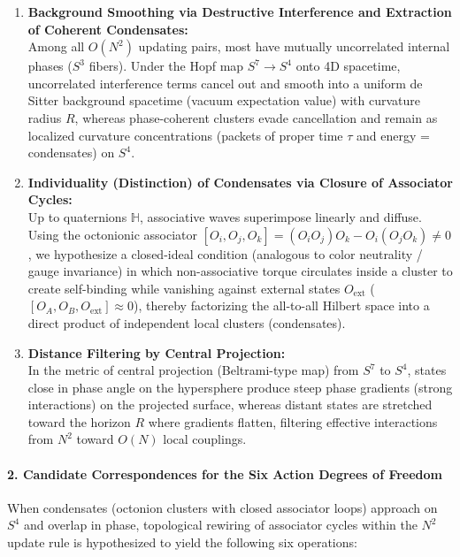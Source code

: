 \documentclass[
  a4paper,
]{article}
\providecommand{\tightlist}{%
  \setlength{\itemsep}{0pt}\setlength{\parskip}{0pt}}
\begin{document}
\begin{enumerate}
\def\labelenumi{\arabic{enumi}.}
\tightlist
\item
  \textbf{Background Smoothing via Destructive Interference and
  Extraction of Coherent Condensates:}\\
  Among all \(O(N^2)\) updating pairs, most have mutually uncorrelated
  internal phases (\(S^3\) fibers). Under the Hopf map \(S^7 \to S^4\)
  onto 4D spacetime, uncorrelated interference terms cancel out and
  smooth into a uniform de Sitter background spacetime (vacuum
  expectation value) with curvature radius \(R\), whereas phase-coherent
  clusters evade cancellation and remain as localized curvature
  concentrations (packets of proper time \(\tau\) and energy =
  condensates) on \(S^4\).
\item
  \textbf{Individuality (Distinction) of Condensates via Closure of
  Associator Cycles:}\\
  Up to quaternions \(\mathbb{H}\), associative waves superimpose
  linearly and diffuse. Using the octonionic associator
  \([O_i, O_j, O_k] = (O_i O_j)O_k - O_i(O_j O_k) \neq 0\), we
  hypothesize a closed-ideal condition (analogous to color neutrality /
  gauge invariance) in which non-associative torque circulates inside a
  cluster to create self-binding while vanishing against external states
  \(O_{\mathrm{ext}}\) (\([O_A, O_B, O_{\mathrm{ext}}] \approx 0\)),
  thereby factorizing the all-to-all Hilbert space into a direct product
  of independent local clusters (condensates).
\item
  \textbf{Distance Filtering by Central Projection:}\\
  In the metric of central projection (Beltrami-type map) from \(S^7\)
  to \(S^4\), states close in phase angle on the hypersphere produce
  steep phase gradients (strong interactions) on the projected surface,
  whereas distant states are stretched toward the horizon \(R\) where
  gradients flatten, filtering effective interactions from \(N^2\)
  toward \(O(N)\) local couplings.
\end{enumerate}

\paragraph{2. Candidate Correspondences for the Six Action Degrees of
Freedom}\label{candidate-correspondences-for-the-six-action-degrees-of-freedom}

When condensates (octonion clusters with closed associator loops)
approach on \(S^4\) and overlap in phase, topological rewiring of
associator cycles within the \(N^2\) update rule is hypothesized to
yield the following six operations:
\end{document}

